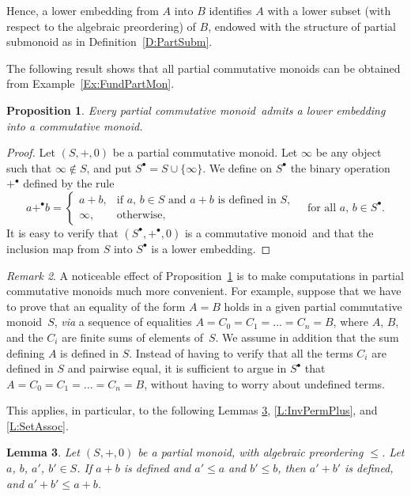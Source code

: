 \documentclass[psamsfonts,reqno]{memo-l}
\theoremstyle{plain}
\newtheorem{lemma}{Lemma}[section]
\newtheorem{proposition}[lemma]{Proposition}
\theoremstyle{definition}
\theoremstyle{remark}
\newtheorem{remark}[lemma]{Remark}
\numberwithin{equation}{section}
\newcommand{\Sbul}{S^{\bullet}}
\newcommand{\blp}{+^{\bullet}}
\newcommand{\cm}{commutative mon\-oid}
\newcommand{\pcm}{partial commutative mon\-oid}
\newcommand{\set}[1]{\{#1\}}
\begin{document}
Hence, a lower embedding from $A$ into $B$ identifies $A$ with a lower subset
(with respect to the algebraic preordering) of $B$, endowed with the
structure of partial submonoid as in Definition~\ref{D:PartSubm}.

The following result shows that all \pcm s can be obtained from Example~\ref{Ex:FundPartMon}.

\begin{proposition}\label{P:PcmCm}
Every \pcm{}\ admits a lower embedding into
a \cm.
\end{proposition}

\begin{proof}
Let $(S,+,0)$ be a \pcm. Let $\infty$ be
any object such that
$\infty\notin S$, and put\index{Szzbul@$\Sbul$|ii}
$\Sbul=S\cup\set{\infty}$. We define on
$\Sbul$ the binary operation $\blp$\index{abzzzlp@$a\blp b$|ii} defined by
the rule
   \[
   a\blp b=\begin{cases}
   a+b,&\text{if }a,\,b\in S\text{ and }a+b\text{ is defined in }S,\\
   \infty,&\text{otherwise},
   \end{cases}
   \quad\text{for all }a,\,b\in\Sbul.
   \]
It is easy to verify that $(\Sbul,\blp,0)$ is a \cm\ and that the inclusion
map from $S$ into $\Sbul$ is a lower embedding.
\end{proof}

\begin{remark}
A noticeable effect of Proposition~\ref{P:PcmCm} is to make computations in
\pcm s much more convenient. For example,
suppose that we have to prove that an equality of the form $A=B$ holds in a
given \pcm{}\ $S$, \emph{via} a sequence of
equalities
$A=C_0=C_1=\dots=C_n=B$, where $A$, $B$, and the $C_i$ are finite sums of
elements of~$S$. We assume in addition that the sum defining $A$ is defined
in $S$. Instead of having to verify that all the terms $C_i$ are defined in
$S$ and pairwise equal, it is sufficient to argue in $\Sbul$ that
$A=C_0=C_1=\dots=C_n=B$, without having to worry about undefined terms.
\end{remark}

This applies, in particular, to the following Lemmas
\ref{L:leqStillDef}, \ref{L:InvPermPlus}, and \ref{L:SetAssoc}.

\begin{lemma}\label{L:leqStillDef}
Let $(S,+,0)$ be a partial monoid, with algebraic preordering $\leq$. Let
$a$, $b$, $a'$, $b'\in S$. If $a+b$ is defined and $a'\leq a$ and
$b'\leq b$, then $a'+b'$ is defined, and $a'+b'\leq a+b$.
\end{lemma}
\end{document}
